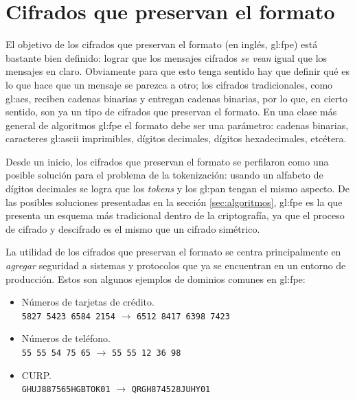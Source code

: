 %
%

\section{Cifrados que preservan el formato}
\label{sec:fpe}

El objetivo de los cifrados que preservan el formato (en inglés, \gls{gl:fpe})
está bastante bien definido: lograr que los mensajes cifrados \textit{se vean}
igual que los mensajes en claro. Obviamente para que esto tenga sentido hay que
definir qué es lo que hace que un mensaje se parezca a otro; los cifrados
tradicionales, como \gls{gl:aes}, reciben cadenas binarias y entregan cadenas
binarias, por lo que, en cierto sentido, son ya un tipo de cifrados
que preservan el formato. En una clase más general de algoritmos \gls{gl:fpe}
el formato debe ser una parámetro: cadenas binarias, caracteres \gls{gl:ascii}
imprimibles, dígitos decimales, dígitos hexadecimales, etcétera.

Desde un inicio, los cifrados que preservan el formato se perfilaron como
una posible solución para el problema de la tokenización: usando un alfabeto
de dígitos decimales se logra que los \textit{tokens} y los \gls{gl:pan} tengan
el mismo aspecto. De las posibles soluciones presentadas en la sección
\ref{sec:algoritmos}, \gls{gl:fpe} es la que presenta un esquema más tradicional
dentro de la criptografía, ya que el proceso de cifrado y descifrado es el mismo
que un cifrado simétrico.

La utilidad de los cifrados que preservan el formato se centra principalmente
en \textit{agregar} seguridad a sistemas y protocolos que ya se encuentran
en un entorno de producción. Estos son algunos ejemplos de dominios
comunes en \gls{gl:fpe}:

\begin{itemize}

  \item Números de tarjetas de crédito. \\
    \texttt{5827 5423 6584 2154} $ \rightarrow $ \texttt{6512 8417 6398 7423}

  \item Números de teléfono. \\
    \texttt{55 55 54 75 65} $ \rightarrow $ \texttt{55 55 12 36 98}

  \item CURP. \\
    \texttt{GHUJ887565HGBTOK01} $ \rightarrow $ \texttt{QRGH874528JUHY01}

\end{itemize}

